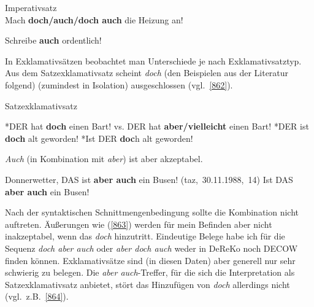 {\begin{exe}
	\ex\label{860}Imperativsatz\\
	Mach \textbf{doch/auch/doch auch} die Heizung an!
\end{exe}

\begin{exe}
	\ex\label{861}
	Schreibe \textbf{auch} ordentlich!
	\hfill\hbox{\citet[90]{Helbig1990}}
\end{exe}
In Exklamativsätzen  beobachtet man Unterschiede je nach Exklamativsatztyp. Aus dem Satzexklamativsatz  scheint \textit{doch} (den Beispielen aus der Literatur folgend) (zumindest in Isolation) ausgeschlossen (vgl.\ \ref{862}).

\begin{exe}
	\ex\label{862}Satzexklamativsatz\\[-1.25em]
		\begin{xlist}	
			\ex\label{862a} *DER hat \textbf{doch} einen Bart! vs. DER hat \textbf{aber/vielleicht} einen Bart!
			\newline
			\hbox{}\hfill\hbox{\citet[218]{Rinas2006}}
			\ex\label{862b} *DER ist \textbf{doch} alt geworden!
	 		\ex\label{862c} *Ist DER \textbf{doc}h alt geworden!		
	 		\hfill\hbox{\citet[224]{Kwon2005}}	
		\end{xlist}
\end{exe}	
\textit{Auch} (in Kombination mit \textit{aber}) ist aber akzeptabel.

\begin{exe}
	\ex\label{863}
		\begin{xlist}	
			\ex\label{863a} Donnerwetter, DAS ist \textbf{aber auch} ein Busen!	
			\hfill\hbox{(taz, 30.11.1988, 14)}
	 		\ex\label{863b} Ist DAS \textbf{aber auch} ein Busen!		
	 		\hfill\hbox{\citet[224]{Kwon2005}}	
		\end{xlist}
\end{exe}	
Nach der syntaktischen Schnittmengenbedingung sollte die Kombination nicht auftreten. Äußerungen wie (\ref{863}) werden für mein Befinden aber nicht inakzep\-tabel, wenn das \textit{doch} hinzutritt. Eindeutige Belege habe ich für die Sequenz \textit{doch aber auch} oder \textit{aber doch auch} weder in DeReKo noch DECOW finden können. Exklamativsätze sind (in diesen Daten) aber generell nur sehr schwierig zu belegen. Die \textit{aber auch}-Treffer, für die sich die Interpretation als Satzexklamativsatz anbietet, stört das Hinzufügen von \textit{doch} allerdings nicht (vgl.\ z.B.\ \ref{864}).

}
